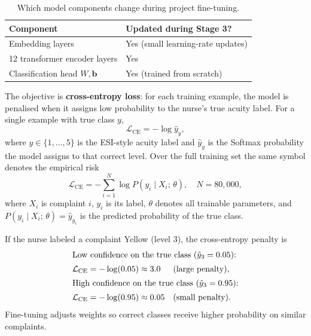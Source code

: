 \begin{table}[H]
\centering
\small
\begin{tabular}{|l|p{8.5cm}|}
\hline
\textbf{Component} & \textbf{Updated during Stage 3?} \\
\hline
Embedding layers & Yes (small learning-rate updates) \\
12 transformer encoder layers & Yes \\
Classification head \(W, \mathbf{b}\) & Yes (trained from scratch) \\
\hline
\end{tabular}
\caption{Which model components change during project fine-tuning.}
\label{tab:trainable-components}
\end{table}

The objective is \textbf{cross-entropy loss}: for each training example, the model is penalised when it assigns low probability to the nurse's true acuity label. For a single example with true class \(y\),
\begin{equation}
  \mathcal{L}_{\mathrm{CE}} = -\log \hat{y}_{y},
\end{equation}
where \(y \in \{1,\ldots,5\}\) is the ESI-style acuity label and \(\hat{y}_{y}\) is the Softmax probability the model assigns to that correct level. Over the full training set the same symbol denotes the empirical risk
\begin{equation}
  \mathcal{L}_{\mathrm{CE}} = -\sum_{i=1}^{N} \log P(y_i \mid X_i;\, \theta), \quad N = 80{,}000,
\end{equation}
where \(X_i\) is complaint \(i\), \(y_i\) is its label, \(\theta\) denotes all trainable parameters, and \(P(y_i \mid X_i;\, \theta)=\hat{y}_{y_i}\) is the predicted probability of the true class.

\begin{example}
If the nurse labeled a complaint Yellow (level 3), the cross-entropy penalty is
\begin{align*}
  \shortintertext{Low confidence on the true class (\(\hat{y}_3 = 0.05\)):}
  \mathcal{L}_{\mathrm{CE}} = -\log(0.05) &\approx 3.0 && \text{(large penalty)}, \\
  \shortintertext{High confidence on the true class (\(\hat{y}_3 = 0.95\)):}
  \mathcal{L}_{\mathrm{CE}} = -\log(0.95) &\approx 0.05 && \text{(small penalty)}.
\end{align*}
Fine-tuning adjusts weights so correct classes receive higher probability on similar complaints.
\end{example}

